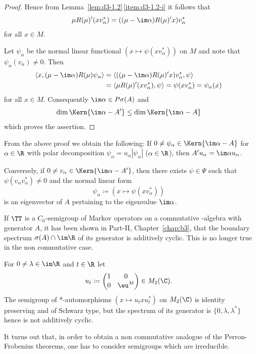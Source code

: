 \begin{proof}
Hence from Lemma~\ref{lem:d3-1.2}\,\ref{item:d3-1.2-i} it follows that
\[
\mu R(\mu)'(xv_{\alpha}^{*}) = ((\mu - \im\alpha)R(\mu)'x)v_{\alpha}^{*}
\]
for all $x \in M$.

Let $\psi_{\alpha}$ be the normal linear functional $(x \mapsto \psi(xv_{\alpha}^{*}))$ on $M$ and note that \mbox{$\psi_{\alpha}(v_{\alpha}) \neq 0$}.
Then
\begin{align*}
\langle x, (\mu - \im\alpha)R(\mu)\psi_{\alpha} \rangle &= \langle ((\mu - \im\alpha)R(\mu)'x)v_{\alpha}^{*},\psi \rangle \\
&= \langle \mu R(\mu)'(xv_{\alpha}^{*}),\psi \rangle = \psi(xv_{\alpha}^{*}) = \psi_{\alpha}(x)
\end{align*}
for all $x \in M$.
Consequently $\im\alpha \in P\sigma(A)$ and
\[
\dim \Kern{\im\alpha - A'} \leq \dim \Kern{\im\alpha - A}
\]
which proves the assertion.
\end{proof}

\begin{remark}\label{rem:d3-1.9}
From the above proof we obtain the following: If 
\mbox{$0 \neq \psi_{\alpha} \in \Kern{\im\alpha - A}$} for $ \alpha \in \R $ with polar decomposition 
$\psi_{\alpha} = u_{\alpha}|\psi_{\alpha}|$ ($\alpha \in \R$), 
then $A'u_{\alpha} = \im\alpha u_{\alpha}$.

Conversely, if\/ $0 \neq v_{\alpha} \in \Kern{\im\alpha - A'}$, then there exists $\psi \in \Psi$ such that 
\mbox{$\psi(v_{\alpha}v_{\alpha}^{*}) \neq 0$} and the normal linear form
\[
\psi_{\alpha} \coloneqq (x \mapsto \psi(xv_{\alpha}^{*}))
\]
is an eigenvector of\/ $A$ pertaining to the eigenvalue $\im\alpha$.
\end{remark}
If\/ $\TT$ is a $C_{0}$-semigroup of Markov operators on a commutative \CA-algebra with generator $A$, it has been shown in Part-II, Chapter~\ref{chap:b3},  that the boundary spectrum $\sigma(A) \cap \im\R$ of its generator is additively cyclic.
This is no longer true in the non commutative case.

\begin{example*}\label{ex:d3-1.10}
For $0 \neq \lambda \in \im\R$ and $t \in \R$ let
\[
u_{t} \coloneqq \begin{pmatrix} 1 & 0 \\ 0 & \eu^{\lambda t} \end{pmatrix} \in M_{2}(\C) .
\]
The semigroup of *-automorphisms $(x \mapsto u_{t}xu_{t}^{*})$ on $M_{2}(\C)$ is identity preserving and of Schwarz type, but the spectrum of its generator is $\{0, \lambda, \lambda^{*}\}$ hence is not additively cyclic.
\end{example*}
It turns out that, in order to obtain a non commutative analogue of the Perron-Frobenius theorems, one has to consider semigroups which are irreducible.

